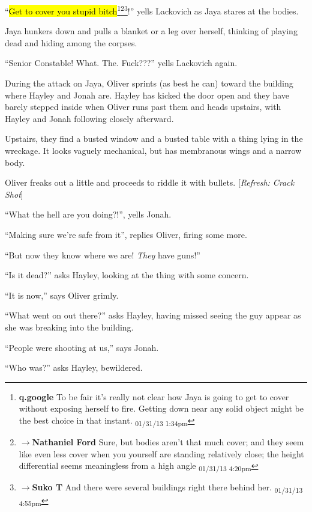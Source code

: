 ``\hl{Get to cover you stupid bitch}\footnote{\textbf{q.google }To be fair it's really not clear how Jaya is going to get to cover without exposing herself to fire.  Getting down near any solid object might be the best choice in that instant. \textsubscript{01/31/13 1:34pm}}\footnote{$\rightarrow$\textbf{Nathaniel Ford }Sure, but bodies aren't that much cover; and they seem like even less cover when you yourself are standing relatively close; the height differential seems meaningless from a high angle \textsubscript{01/31/13 4:20pm}}\footnote{$\rightarrow$\textbf{Suko T }And there were several buildings right there behind her. \textsubscript{01/31/13 4:55pm}}!'' yells Lackovich as Jaya stares at the bodies.

Jaya hunkers down and pulls a blanket or a leg over herself, thinking of playing dead and hiding among the corpses.

``Senior Constable!  What.  The.  Fuck???''  yells Lackovich again.



During the attack on Jaya, Oliver sprints (as best he can) toward the building where Hayley and Jonah are.  Hayley has kicked the door open and they have barely stepped inside when Oliver runs past them and heads upstairs, with Hayley and Jonah following closely afterward.



Upstairs, they find a busted window and a busted table with a thing lying in the wreckage.  It looks vaguely mechanical, but has membranous wings and a narrow body.

Oliver freaks out a little and proceeds to riddle it with bullets. {[}\textit{Refresh: Crack Shot}{]}

``What the hell are you doing?!'', yells Jonah.

``Making sure we're safe from it'', replies Oliver, firing some more.

``But now they know where we are!  \textit{They} have guns!''



``Is it dead?'' asks Hayley, looking at the thing with some concern.

``It is now,'' says Oliver grimly.

``What went on out there?'' asks Hayley, having missed seeing the guy appear as she was breaking into the building.

``People were shooting at us,'' says Jonah.

``Who was?'' asks Hayley, bewildered.

